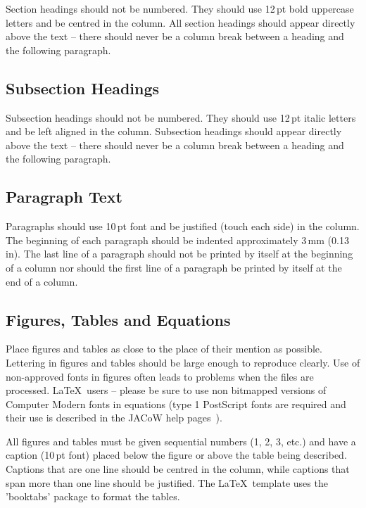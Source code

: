 \documentclass{JAC2003}
\begin{document}
Section headings should not be numbered. They should
use  12\,pt  bold  uppercase  letters  and  be  centred  in  the
column. All section headings should appear directly above
the text -- there should never be a column break between a heading and the
following paragraph.

\subsection{Subsection Headings}

Subsection  headings  should  not  be  numbered.  They
should use 12\,pt italic letters and be left aligned in the
column. Subsection headings should appear
directly above the text -- there should never be a column break between a
heading and the following paragraph.

\subsection{Paragraph Text}

Paragraphs should use 10\,pt font and be justified (touch each side) in
the column. The beginning of each paragraph should be indented
approximately 3\,mm (0.13\,in). The last line of a paragraph should not be
printed by itself at the beginning of a column nor should the first line of
a paragraph be printed by itself at the end of a column.

\subsection{Figures, Tables and Equations}

Place figures and tables as close to the place of their mention as
possible. Lettering in figures and tables should be large enough to
reproduce clearly. Use of non-approved fonts in figures often leads to
problems when the files are processed. \LaTeX\ users -- please be sure to use non bitmapped
versions of Computer Modern fonts in equations (type 1 PostScript fonts are
required and their use is described in the JACoW help pages~\cite{jacow-help}).

All figures and tables must be given sequential numbers (1, 2, 3, etc.) and
have a caption (10\,pt font) placed below the figure or above the table being described.
Captions that are one line should be centred in the column, while captions
that span more than one line should be justified. The \LaTeX\ template uses the 'booktabs' 
package to format the tables.
\end{document}
